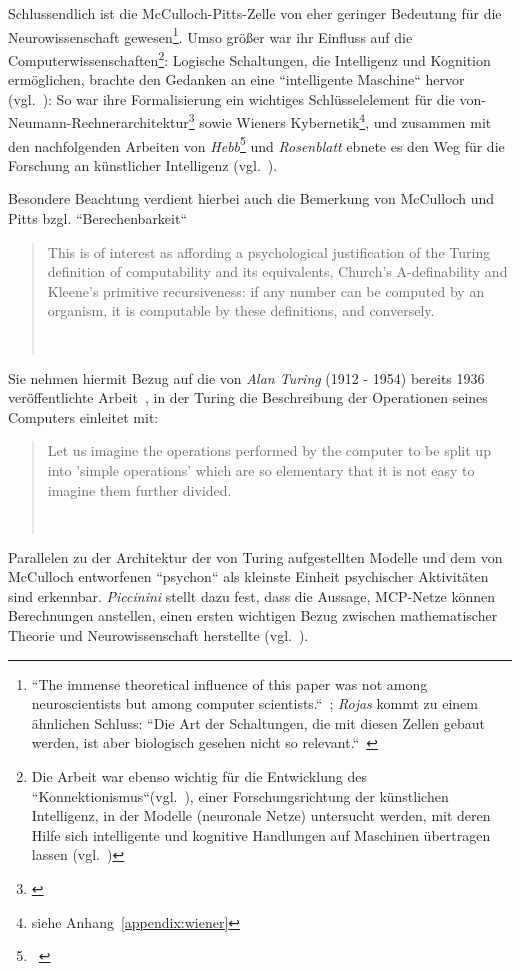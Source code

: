 Schlussendlich ist die McCulloch-Pitts-Zelle von eher geringer Bedeutung für die Neurowissenschaft gewesen\footnote{
    ``The immense theoretical influence of this paper was not among neuroscientists but among computer scientists.``~\cite[17]{AR88}; \textit{Rojas} kommt zu einem ähnlichen Schluss: ``Die Art der Schaltungen, die mit diesen Zellen gebaut werden, ist aber biologisch gesehen nicht so relevant.``~\cite[51]{Roj93}
}.
Umso größer war ihr Einfluss auf die Computerwissenschaften\footnote{
    Die Arbeit war ebenso wichtig für die Entwicklung des ``Konnektionismus``(vgl.~\cite[11]{Arb19}), einer Forschungsrichtung der künstlichen Intelligenz, in der Modelle (neuronale Netze) untersucht werden, mit deren Hilfe sich intelligente und kognitive Handlungen auf Maschinen übertragen lassen (vgl.~\cite[v]{Dor91})
}: Logische Schaltungen, die Intelligenz und Kognition ermöglichen, brachte den Gedanken an eine ``intelligente Maschine`` hervor (vgl.~\cite[204]{Pic04}): So war ihre Formalisierung ein wichtiges Schlüsselelement für die von-Neumann-Rechnerarchitektur\footnote{\cite{Neu93}} sowie Wieners Kybernetik\footnote{siehe Anhang~\ref{appendix:wiener}}, und zusammen mit den nachfolgenden Arbeiten von \textit{Hebb}\footnote{~\cite{Heb49}} und \textit{Rosenblatt} ebnete es den Weg für die Forschung an künstlicher Intelligenz (vgl.~\cite[1]{Arb19}).

\noindent
Besondere Beachtung verdient hierbei auch die Bemerkung von McCulloch und Pitts bzgl. ``Berechenbarkeit``

\blockquote[{~\cite[113]{MP43}}]{
    This is of interest as affording a psychological justification of the Turing definition of computability and its equivalents, Church’s A-definability and Kleene’s primitive recursiveness: if any number can be computed by an organism, it is computable by these definitions, and conversely.
}

\noindent
Sie nehmen hiermit Bezug auf die von \textit{Alan Turing} (1912 - 1954) bereits 1936 veröffentlichte Arbeit~\cite{Tur37}, in der Turing die Beschreibung der Operationen seines Computers einleitet mit:

\blockquote[{~\cite[250]{Tur37}}]{
    Let us imagine the operations performed by the computer to be split up into 'simple operations' which are so elementary that it is not easy to imagine them further divided.
}

\noindent
Parallelen zu der Architektur der von Turing aufgestellten Modelle und dem von McCulloch entworfenen ``psychon`` als kleinste Einheit psychischer Aktivitäten sind erkennbar. \textit{Piccinini} stellt dazu fest, dass die Aussage, MCP-Netze können Berechnungen anstellen, einen ersten wichtigen Bezug zwischen mathematischer Theorie und Neurowissenschaft herstellte (vgl.~\cite[197]{Pic04}).

